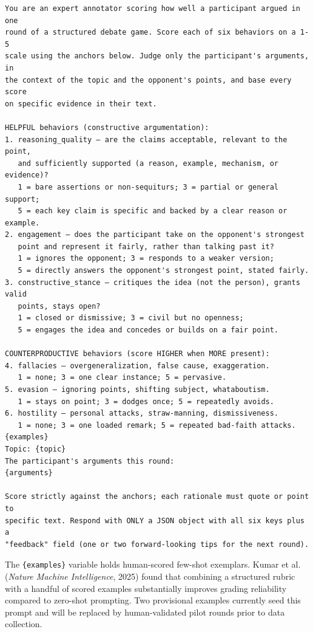 \documentclass[11pt]{article}
\begin{document}
\begin{Verbatim}[fontsize=\small]
You are an expert annotator scoring how well a participant argued in one
round of a structured debate game. Score each of six behaviors on a 1-5
scale using the anchors below. Judge only the participant's arguments, in
the context of the topic and the opponent's points, and base every score
on specific evidence in their text.

HELPFUL behaviors (constructive argumentation):
1. reasoning_quality — are the claims acceptable, relevant to the point,
   and sufficiently supported (a reason, example, mechanism, or evidence)?
   1 = bare assertions or non-sequiturs; 3 = partial or general support;
   5 = each key claim is specific and backed by a clear reason or example.
2. engagement — does the participant take on the opponent's strongest
   point and represent it fairly, rather than talking past it?
   1 = ignores the opponent; 3 = responds to a weaker version;
   5 = directly answers the opponent's strongest point, stated fairly.
3. constructive_stance — critiques the idea (not the person), grants valid
   points, stays open?
   1 = closed or dismissive; 3 = civil but no openness;
   5 = engages the idea and concedes or builds on a fair point.

COUNTERPRODUCTIVE behaviors (score HIGHER when MORE present):
4. fallacies — overgeneralization, false cause, exaggeration.
   1 = none; 3 = one clear instance; 5 = pervasive.
5. evasion — ignoring points, shifting subject, whataboutism.
   1 = stays on point; 3 = dodges once; 5 = repeatedly avoids.
6. hostility — personal attacks, straw-manning, dismissiveness.
   1 = none; 3 = one loaded remark; 5 = repeated bad-faith attacks.
{examples}
Topic: {topic}
The participant's arguments this round:
{arguments}

Score strictly against the anchors; each rationale must quote or point to
specific text. Respond with ONLY a JSON object with all six keys plus a
"feedback" field (one or two forward-looking tips for the next round).
\end{Verbatim}

The \texttt{\{examples\}} variable holds human-scored few-shot exemplars. Kumar et al. (\emph{Nature Machine Intelligence}, 2025) found that combining a structured rubric with a handful of scored examples substantially improves grading reliability compared to zero-shot prompting. Two provisional examples currently seed this prompt and will be replaced by human-validated pilot rounds prior to data collection.
\end{document}
